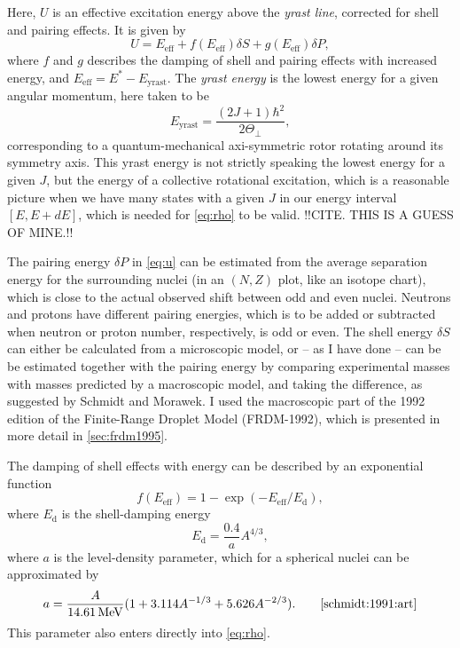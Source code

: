 Here, $U$ is an effective excitation energy above the \emph{yrast line}, corrected for shell and pairing effects. It is given by
\begin{equation}
U=E_\text{eff} + f(E_\text{eff})\delta S + g(E_\text{eff})\delta P,\label{eq:u}
\end{equation}
where $f$ and $g$ describes the damping of shell and pairing effects with increased energy, and $E_\text{eff} = E^*-E_\text{yrast}$. The \emph{yrast energy} is the lowest energy for a given angular momentum, here taken to be
\begin{equation}
E_\text{yrast} = \frac{(2J+1)\hbar^2}{2\Theta_\perp},
\end{equation}
corresponding to a quantum-mechanical axi-symmetric rotor rotating around its symmetry axis. This yrast energy is not strictly speaking the lowest energy for a given $J$, but the energy of a collective rotational excitation, which is a reasonable picture when we have many states with a given $J$ in our energy interval $[E,E+dE]$, which is needed for \eqref{eq:rho} to be valid. !!CITE. THIS IS A GUESS OF MINE.!!

The pairing energy $\delta P$ in \eqref{eq:u} can be estimated from the average separation energy for the surrounding nuclei (in an $(N,Z)$ plot, like an isotope chart), which is close to the actual observed shift between odd and even nuclei\cite{ericson:1960}. Neutrons and protons have different pairing energies, which is to be added or subtracted when neutron or proton number, respectively, is odd or even. 
The shell energy $\delta S$ can either be calculated from a microscopic model, or -- as I have done -- can be be estimated together with the pairing energy by comparing experimental masses with masses predicted by a macroscopic model, and taking the difference, as suggested by Schmidt and Morawek\cite{schmidt:1991:art}. I used the macroscopic part of the 1992 edition of the Finite-Range Droplet Model (FRDM-1992)\cite{moller1995}, which is presented in more detail in \autoref{sec:frdm1995}.

The damping of shell effects with energy can be described by an exponential function
\begin{equation}
f(E_\text{eff}) = 1-\exp{\left(-E_\text{eff}/E_\text{d}\right)},
\end{equation}
where $E_\text{d}$ is the shell-damping energy 
\begin{equation}
E_\text{d} = \frac{0.4}{a} A^{4/3},
\end{equation}
where $a$ is the level-density parameter, which for a spherical nuclei can be approximated by
\begin{equation}
a=\frac{A}{\unit[14.61]{MeV}}(1+3.114 A^{-1/3} + 5.626 A^{-2/3}).\qquad\cite{schmidt:1991:art}\label{eq:a}
\end{equation}
This parameter also enters directly into \eqref{eq:rho}.

